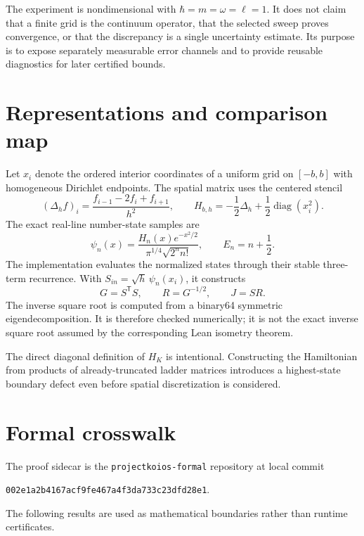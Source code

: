 \documentclass[11pt]{article}
\newcommand{\code}[1]{\texttt{#1}}
\begin{document}
The experiment is nondimensional with
$\hbar=m=\omega=\ell=1$.  It does not claim that a finite grid is the continuum
operator, that the selected sweep proves convergence, or that the discrepancy is a
single uncertainty estimate.  Its purpose is to expose separately measurable error
channels and to provide reusable diagnostics for later certified bounds.

\section{Representations and comparison map}

Let $x_i$ denote the ordered interior coordinates of a uniform grid on $[-b,b]$ with
homogeneous Dirichlet endpoints.  The spatial matrix uses the centered stencil
\begin{equation}
  (\Delta_h f)_i=\frac{f_{i-1}-2f_i+f_{i+1}}{h^2},
  \qquad
  H_{b,h}=-\frac12\Delta_h+\frac12\operatorname{diag}(x_i^2).
\end{equation}
The exact real-line number-state samples are
\begin{equation}
  \psi_n(x)=\frac{H_n(x)e^{-x^2/2}}{\pi^{1/4}\sqrt{2^n n!}},
  \qquad E_n=n+\frac12.
\end{equation}
The implementation evaluates the normalized states through their stable three-term
recurrence.  With $S_{in}=\sqrt{h}\,\psi_n(x_i)$, it constructs
\begin{equation}
  G=S^{\mathsf T}S,\qquad R=G^{-1/2},\qquad J=SR.
  \label{eq:gram-map}
\end{equation}
The inverse square root is computed from a binary64 symmetric eigendecomposition.  It
is therefore checked numerically; it is not the exact inverse square root assumed by
the corresponding Lean isometry theorem.

The direct diagonal definition of $H_K$ is intentional.  Constructing the Hamiltonian
from products of already-truncated ladder matrices introduces a highest-state boundary
defect even before spatial discretization is considered.

\section{Formal crosswalk}

The proof sidecar is the \code{projectkoios-formal} repository at local commit
\begin{center}
\small\code{002e1a2b4167acf9fe467a4f3da733c23dfd28e1}.
\end{center}
The following results are used as mathematical boundaries rather than runtime
certificates.
\end{document}

